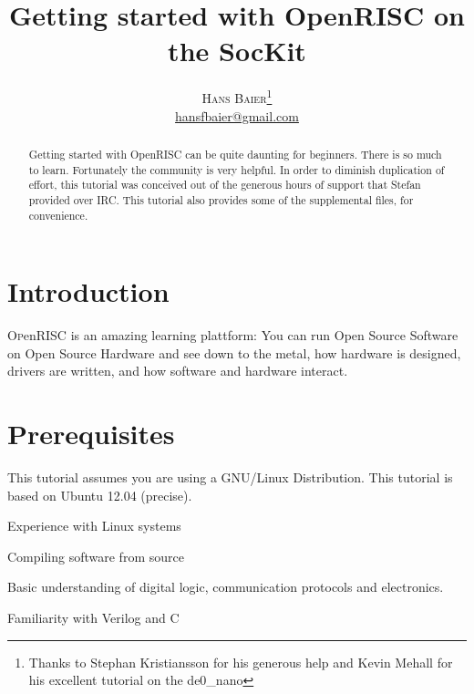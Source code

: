 \documentclass[twoside]{article}
\title{\vspace{-15mm}\fontsize{24pt}{10pt}\selectfont\textbf{Getting
    started with OpenRISC on the SocKit}} %
\author{
\large
\textsc{Hans Baier}\thanks{Thanks to Stephan Kristiansson for his
  generous help and Kevin Mehall for his excellent tutorial on the de0\_nano}\\[2mm] 
\normalsize \href{mailto:hansfbaier@gmail.com}{hansfbaier@gmail.com} %
\vspace{-5mm}
}
\date{}
\begin{document}
\maketitle %

\thispagestyle{fancy} %


\begin{abstract}

\noindent Getting started with OpenRISC can be quite daunting for
beginners. There is so much to learn. Fortunately the community is
very helpful. In order to diminish duplication of effort, this
tutorial was conceived out of the generous hours of support that
Stefan provided over IRC. This tutorial also provides some of the
supplemental files, for convenience.

\end{abstract}



\section{Introduction}

\lettrine[nindent=0em,lines=3]{O} penRISC is an amazing learning
plattform: You can run Open Source Software on Open Source Hardware
and see down to the metal, how hardware is designed, drivers are
written, and how software and hardware interact.  


\section{Prerequisites}
This tutorial assumes you are using a GNU/Linux Distribution. This
tutorial is based on Ubuntu 12.04 (precise).

\begin{compactitem}
\item Experience with Linux systems
\item Compiling software from source
\item Basic understanding of digital logic, communication protocols
  and electronics.
\item Familiarity with Verilog and C
\end{compactitem}
\end{document}
